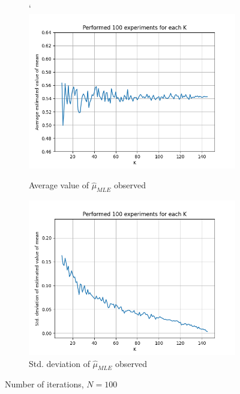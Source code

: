 \documentclass[fleqn, 11pt]{article}
\begin{document}
\vspace{30pt}
\begin{figure}[H]
    \centering
    \begin{subfigure}[H]{0.49\textwidth}
        \centering`
        \includegraphics[width=\textwidth]{P1/mu/avgs_100.png}
        \caption[]{Average value of $\hat{\mu}_{MLE}$ observed}
    \end{subfigure}
    \begin{subfigure}[H]{0.49\textwidth}
        \centering
        \includegraphics[width=\textwidth]{P1/mu/stds_100.png}
        \caption[]{Std. deviation of $\hat{\mu}_{MLE}$ observed}
    \end{subfigure}
    \caption{Number of iterations, $N = 100$}
\end{figure}
\end{document}
